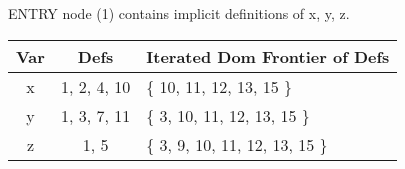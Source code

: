 \documentclass[12pt]{article}
\begin{document}
\begin{enumerate}
{\begin{center}
  ENTRY node (1) contains implicit definitions of x, y, z.

  \begin{tabular}{c|c|l} \hline
  Var & Defs & Iterated Dom Frontier of Defs \\ \hline \hline
  x & 1, 2, 4, 10 & \{ 10, 11, 12, 13, 15 \} \\ \hline
  y & 1, 3, 7, 11 & \{  3, 10, 11, 12, 13, 15 \} \\ \hline
  z & 1, 5 &        \{  3,  9, 10, 11, 12, 13, 15 \} \\ \hline
  \end{tabular}
\end{center}
\begin{center}
\newcommand{\symbox}[2]{#1.\psframebox{#2}\phantom{#1.}}


\end{center}}
\end{enumerate}
\end{document}

